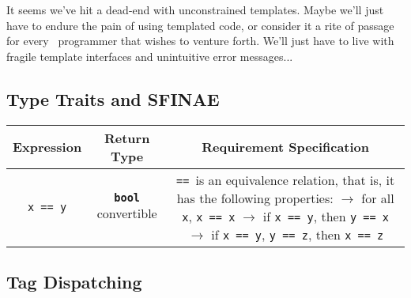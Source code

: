 It seems we've hit a dead-end with unconstrained templates. Maybe we'll just have to endure the pain of using templated code, or consider it a rite of passage for every \Cpp\ programmer that wishes to venture forth. We'll just have to live with fragile template interfaces and unintuitive error messages...

\newpage

    

\subsection{Type Traits and SFINAE} \label{sec:type_traits_and_sfinae}

    \begin{table}[h]
    \begin{tabular}{ccc}
        \toprule
        \bf{Expression} & \bf{Return Type} & \bf{Requirement Specification} \\
        \midrule
        \texttt{x == y} & \textbf{\texttt{bool}} convertible & \makecell[l]{\texttt{==}\, is an equivalence relation, that is,\\
                                                                it has the following properties:\\
                                                                $\rightarrow$ for all \texttt{x}, \texttt{x == x}\\
                                                                $\rightarrow$ if \texttt{x == y}, then \texttt{y == x}\\
                                                                $\rightarrow$ if \texttt{x == y}, \texttt{y == z}, then \texttt{x == z}} \\
        \bottomrule
    \end{tabular}
    \end{table}

    

    

    

    

    

\subsection{Tag Dispatching} \label{sec:tag_dispatching}

    

    

    
